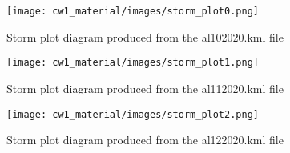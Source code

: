 \documentclass[]{article}
\begin{document}
\begin{figure}
    \centering
    \texttt{[image: cw1\_material/images/storm\_plot0.png]}
    \caption{Storm plot diagram produced from the al102020.kml file}
    \label{fig:storm_plot1}
\end{figure}

\begin{figure}
    \centering
    \texttt{[image: cw1\_material/images/storm\_plot1.png]}
    \caption{Storm plot diagram produced from the al112020.kml file}
    \label{fig:storm_plot2}
\end{figure}

\begin{figure}
    \centering
    \texttt{[image: cw1\_material/images/storm\_plot2.png]}
    \caption{Storm plot diagram produced from the al122020.kml file}
    \label{fig:storm_plot3}
\end{figure}
\end{document}
